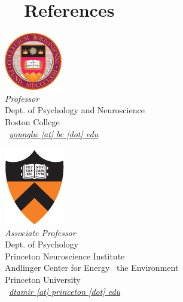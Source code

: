 \documentclass[10pt, a4paper, english]{cv_public}
\begin{document}
\section*{\faUserPlus \ \ References}

\centering
\begin{multicols}{2}
\raggedright{
    \signature{\href{https://www.bc.edu/bc-web/schools/mcas/departments/psychology/people/faculty-directory/liane-young.html}{Liane Young, Ph.D.}} \includegraphics[scale=.1]{img/bc_seal.png} \\
    \textsl{Professor} \\
    Dept. of Psychology and Neuroscience \\
    Boston College \\
    {\footnotesize \faEnvelope} \ \textit{\href{mailto:younglw@bc.edu}{younglw [at] bc [dot] edu}} \\
}
\vspace{32.5pt}
\raggedright{
    \signature{\href{https://psych.princeton.edu/person/diana-tamir}{Diana I. Tamir, Ph.D.}}
    \includegraphics[scale=.07]{img/princeton_standard.png} \\
    \textsl{Associate Professor} \\
    Dept. of Psychology \\
    Princeton Neuroscience Institute \\
    Andlinger Center for Energy \Plus \ the Environment \\
    Princeton University \\
    {\footnotesize \faEnvelope} \ \textit{\href{mailto:dtamir@princeton.edu}{dtamir [at] princeton [dot] edu}} \\
}


\vfill\null
\columnbreak
\centering{
   
}
\end{multicols}
\end{document}
